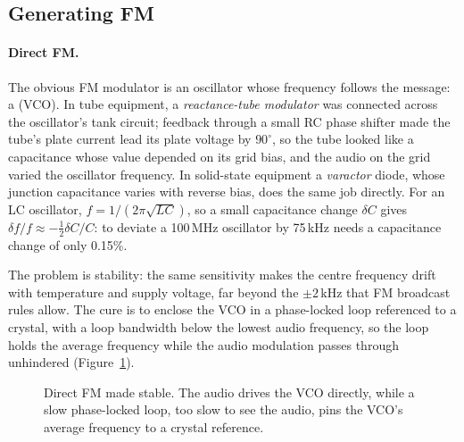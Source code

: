 \subsection{Generating FM}
\label{sec:ch04:fmgen}

\paragraph{Direct FM.} The obvious FM modulator is an oscillator whose frequency follows the message: a
 (VCO). In tube equipment, a \emph{reactance-tube modulator} was
connected across the oscillator's tank circuit; feedback through a small RC phase shifter made the tube's
plate current lead its plate voltage by $90^\circ$, so the tube looked like a capacitance whose value
depended on its grid bias, and the audio on the grid varied the oscillator frequency. In solid-state
equipment a \emph{varactor} diode, whose junction capacitance varies with reverse bias, does the same job
directly. For an LC oscillator, $f=1/(2\pi\sqrt{LC})$, so a small capacitance change $\delta C$ gives
$\delta f/f\approx-\frac12\delta C/C$: to deviate a 100\,MHz oscillator by 75\,kHz needs a capacitance
change of only 0.15\%.

The problem is stability: the same sensitivity makes the centre frequency drift with temperature and
supply voltage, far beyond the $\pm2$\,kHz that FM broadcast rules allow. The cure is to enclose the VCO in
a phase-locked loop referenced to a crystal, with a loop bandwidth below the lowest audio frequency, so the
loop holds the average frequency while the audio modulation passes through unhindered
(Figure~\ref{fig:ch04_pllfm}).

\begin{figure}[htbp]\centering
{}
\caption{Direct FM made stable. The audio drives the VCO directly, while a slow phase-locked loop, too slow
to see the audio, pins the VCO's average frequency to a crystal reference.}
\label{fig:ch04_pllfm}
\end{figure}

